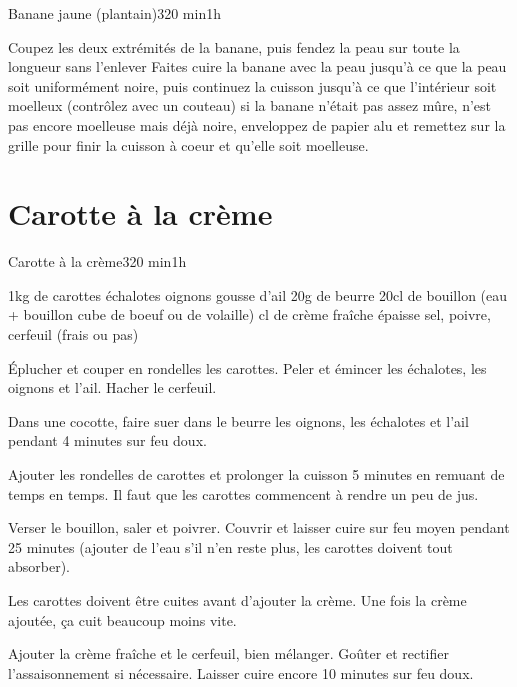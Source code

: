 {\begin{recette}{Banane jaune (plantain)}{3}{20 min}{1h}
\begin{preparation}
\etape Coupez les deux extrémités de la banane, puis fendez la peau sur toute la longueur sans l'enlever
\etape Faites cuire la banane avec la peau jusqu'à ce que la peau soit uniformément noire, puis continuez la cuisson jusqu'à ce que l'intérieur soit moelleux (contrôlez avec un couteau)
\etape si la banane n'était pas assez mûre, n'est pas encore moelleuse mais déjà noire, enveloppez de papier alu et remettez sur la grille pour finir la cuisson à coeur et qu'elle soit moelleuse. 
\end{preparation}
\end{recette}

\section{Carotte à la crème}
\begin{recette}{Carotte à la crème}{3}{20 min}{1h}
\begin{ingredients}
\ingredient 1kg de carottes
 échalotes
 oignons
 gousse d'ail
\ingredient 20g de beurre
\ingredient 20cl de bouillon (eau + bouillon cube de boeuf ou de volaille)
 cl de crème fraîche épaisse
\ingredient sel, poivre, cerfeuil (frais ou pas)
\end{ingredients}

\begin{preparation}
\etape Éplucher et couper en rondelles les carottes. Peler et émincer les échalotes, les oignons et l’ail. Hacher le cerfeuil.

\etape Dans une cocotte, faire suer dans le beurre les oignons, les échalotes et l’ail pendant 4 minutes sur feu doux.

\etape Ajouter les rondelles de carottes et prolonger la cuisson 5 minutes en remuant de temps en temps. Il faut que les 
carottes commencent à rendre un peu de jus.

\etape Verser le bouillon, saler et poivrer. Couvrir et laisser cuire sur feu moyen pendant 25 minutes (ajouter de l'eau s'il 
n'en reste plus, les carottes doivent tout absorber).

\begin{remarque}
Les carottes doivent être cuites avant d'ajouter la crème. Une fois la crème ajoutée, ça cuit beaucoup moins vite.
\end{remarque}

\etape Ajouter la crème fraîche et le cerfeuil, bien mélanger. Goûter et rectifier l’assaisonnement si nécessaire. Laisser cuire 
encore 10 minutes sur feu doux.


\end{preparation}
\end{recette}}
